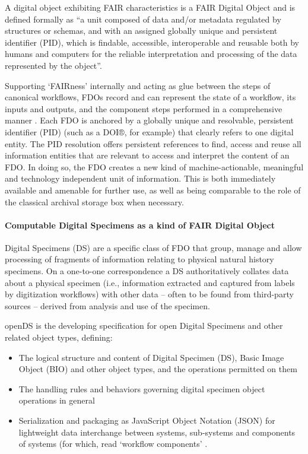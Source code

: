 A digital object exhibiting FAIR characteristics is a FAIR Digital
Object \cite{De Smedt 2020} and is defined formally as ``a unit composed of data
and/or metadata regulated by structures or schemas, and with an assigned
globally unique and persistent identifier (PID), which is findable,
accessible, interoperable and reusable both by humans and computers for
the reliable interpretation and processing of the data represented by
the object''.

Supporting `FAIRness' internally and acting as glue between the steps of
canonical workflows, FDOs record and can represent the state of a
workflow, its inputs and outputs, and the component steps performed in a
comprehensive manner \cite{ch8-27}. Each FDO is anchored by a globally unique
and resolvable, persistent identifier (PID) (such as a DOI®, for
example) that clearly refers to one digital entity. The PID resolution
offers persistent references to find, access and reuse all information
entities that are relevant to access and interpret the content of an
FDO. In doing so, the FDO creates a new kind of machine-actionable,
meaningful and technology independent unit of information. This is both
immediately available and amenable for further use, as well as being
comparable to the role of the classical archival storage box when
necessary.

\hypertarget{computable-digital-specimens-as-a-kind-of-fair-digital-object}{%
\paragraph{Computable Digital Specimens as a kind of FAIR Digital
Object}\label{computable-digital-specimens-as-a-kind-of-fair-digital-object}}

Digital Specimens (DS) are a specific class of FDO that group, manage
and allow processing of fragments of information relating to physical
natural history specimens. On a one-to-one correspondence a DS
authoritatively collates data about a physical specimen (i.e.,
information extracted and captured from labels by digitization
workflows) with other data -- often to be found from third-party sources
-- derived from analysis and use of the specimen.

openDS \cite{ch8-47} is the developing specification for open Digital
Specimens and other related object types, defining: 

\begin{itemize}
  \item The logical
  structure and content of Digital Specimen (DS), Basic Image Object (BIO)
  and other object types, and the operations permitted on them
  \item The
  handling rules and behaviors governing digital specimen object
  operations in general
  \item Serialization and packaging as
  JavaScript Object Notation (JSON) for lightweight data interchange
  between systems, sub-systems and components of systems (for which, read
  `workflow components' \cite{ch8-48}. 
\end{itemize}

